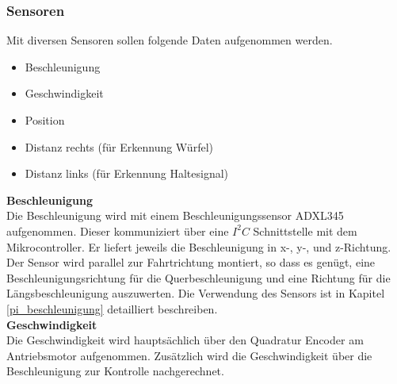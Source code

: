 \documentclass[../../main.tex]{subfiles}
\begin{document}
    \subsubsection{Sensoren} \label{et_sensoren}
    Mit diversen Sensoren sollen folgende Daten aufgenommen werden.
    \begin{itemize}
        \item Beschleunigung
        \item Geschwindigkeit
        \item Position
        \item Distanz rechts (für Erkennung Würfel)
        \item Distanz links (für Erkennung Haltesignal)
    \end{itemize}
    \pagebreak
    \textbf{Beschleunigung}\\
    Die Beschleunigung wird mit einem Beschleunigungssensor ADXL345 aufgenommen. Dieser kommuniziert über eine $I^2C$ Schnittstelle mit dem Mikrocontroller. Er liefert jeweils die Beschleunigung in x-, y-, und z-Richtung. Der Sensor wird parallel zur Fahrtrichtung montiert, so dass es genügt, eine Beschleunigungsrichtung für die Querbeschleunigung und eine Richtung für die Längsbeschleunigung auszuwerten. Die Verwendung des Sensors ist in Kapitel \ref{pi_beschleunigung} detailliert beschreiben.\\

    \textbf{Geschwindigkeit}\\
    Die Geschwindigkeit wird hauptsächlich über den Quadratur Encoder am Antriebsmotor aufgenommen. Zusätzlich wird die
    Geschwindigkeit über die Beschleunigung zur Kontrolle nachgerechnet.
\end{document}
